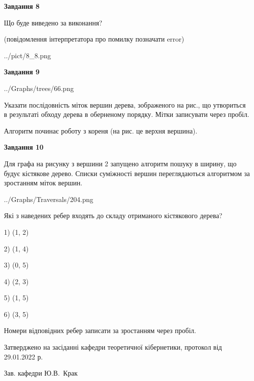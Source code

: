\documentclass[12pt, ukrainian]{article}
\begin{document}
{\begin {large}
{\begin {center}\textbf{Завдання 8}\end {center}}\par
Що буде виведено за виконання?\par
 (повідомлення інтерпретатора про помилку позначати error)\par
\begin{center}
	{../pict/8_8.png}
\end{center}
\newpage

{\begin {center}\textbf{Завдання 9}\end {center}}\par

\begin{center}
	{../Graphs/trees/66.png}
\end{center}
Указати послідовність міток вершин дерева, зображеного на рис., що утвориться в результаті обходу дерева в оберненому порядку. Мітки записувати через пробіл.\par Алгоритм починає роботу з кореня (на рис. це верхня вершина).\par
\newpage

{\begin {center}\textbf{Завдання 10}\end {center}}\par
Для графа на рисунку з вершини 2 запущено алгоритм пошуку в ширину, що будує кістякове дерево. Списки суміжності вершин переглядаються алгоритмом за зростанням міток вершин.\par
\begin{center}
	{../Graphs/Traversals/204.png}
\end{center}
\par Які з наведених ребер входять до складу отриманого кістякового дерева?\par
1) (1, 2)\par
2) (1, 4)\par
3) (0, 5)\par
4) (2, 3)\par
5) (1, 5)\par
6) (3, 5)\par
{\vskip 15pt} Номери відповідних ребер записати за зростанням через пробіл.\par
\newpage


\end {large}
}
{\smallskip \begin {small} Затверджено на засіданні кафедри теоретичної кібернетики, протокол  від   29.01.2022 р.\par\smallskip\smallskip
{\parbox {6.5 cm}{Зав. кафедри \dotfill Ю.В.~Крак}} \end{small}}
\end{document}
